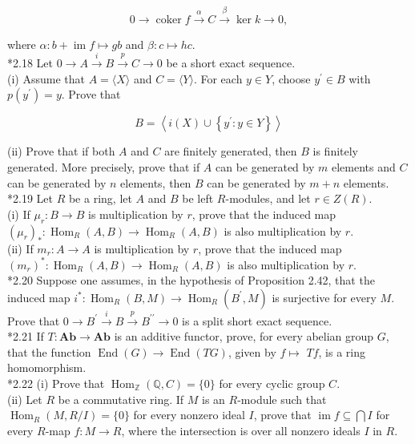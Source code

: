 \documentclass[10pt, letterpaper]{article}
\begin{document}
$$
0 \rightarrow \operatorname{coker} f \xrightarrow{\alpha} C \xrightarrow{\beta} \operatorname{ker} k \rightarrow 0,
$$

where $\alpha: b+\operatorname{im} f \mapsto g b$ and $\beta: c \mapsto h c$.\\
*2.18 Let $0 \rightarrow A \xrightarrow{i} B \xrightarrow{p} C \rightarrow 0$ be a short exact sequence.\\
(i) Assume that $A=\langle X\rangle$ and $C=\langle Y\rangle$. For each $y \in Y$, choose $y^{\prime} \in B$ with $p\left(y^{\prime}\right)=y$. Prove that

$$
B=\left\langle i(X) \cup\left\{y^{\prime}: y \in Y\right\}\right\rangle
$$

(ii) Prove that if both $A$ and $C$ are finitely generated, then $B$ is finitely generated. More precisely, prove that if $A$ can be generated by $m$ elements and $C$ can be generated by $n$ elements, then $B$ can be generated by $m+n$ elements.\\
*2.19 Let $R$ be a ring, let $A$ and $B$ be left $R$-modules, and let $r \in Z(R)$.\\
(i) If $\mu_{r}: B \rightarrow B$ is multiplication by $r$, prove that the induced map $\left(\mu_{r}\right)_{*}: \operatorname{Hom}_{R}(A, B) \rightarrow \operatorname{Hom}_{R}(A, B)$ is also multiplication by $r$.\\
(ii) If $m_{r}: A \rightarrow A$ is multiplication by $r$, prove that the induced map $\left(m_{r}\right)^{*}: \operatorname{Hom}_{R}(A, B) \rightarrow \operatorname{Hom}_{R}(A, B)$ is also multiplication by $r$.\\
*2.20 Suppose one assumes, in the hypothesis of Proposition 2.42, that the induced map $i^{*}: \operatorname{Hom}_{R}(B, M) \rightarrow \operatorname{Hom}_{R}\left(B^{\prime}, M\right)$ is surjective for every $M$. Prove that $0 \rightarrow B^{\prime} \xrightarrow{i} B \xrightarrow{p} B^{\prime \prime} \rightarrow 0$ is a split short exact sequence.\\
*2.21 If $T: \mathbf{A b} \rightarrow \mathbf{A b}$ is an additive functor, prove, for every abelian group $G$, that the function $\operatorname{End}(G) \rightarrow \operatorname{End}(T G)$, given by $f \mapsto$ $T f$, is a ring homomorphism.\\
*2.22 (i) Prove that $\operatorname{Hom}_{\mathbb{Z}}(\mathbb{Q}, C)=\{0\}$ for every cyclic group $C$.\\
(ii) Let $R$ be a commutative ring. If $M$ is an $R$-module such that $\operatorname{Hom}_{R}(M, R / I)=\{0\}$ for every nonzero ideal $I$, prove that $\operatorname{im} f \subseteq \bigcap I$ for every $R$-map $f: M \rightarrow R$, where the intersection is over all nonzero ideals $I$ in $R$.\\
\end{document}
